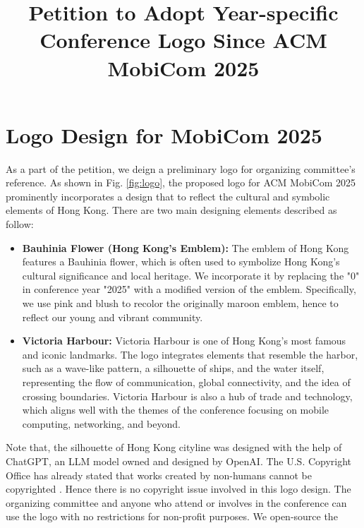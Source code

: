 \documentclass[sigconf, 10pt]{acmart}
\begin{document}
\title{Petition to Adopt Year-specific Conference Logo Since ACM MobiCom 2025}

\newcommand{\wrt}{{\em w.r.t. }}
\newcommand{\para}[1]{\smallskip\noindent {\bf #1}}

\setlength{\abovecaptionskip}{0pt}
\setlength{\belowcaptionskip}{0pt}
\setlength{\abovedisplayshortskip}{0pt}
\setlength{\belowdisplayshortskip}{0pt}
\setlength{\textfloatsep}{0pt}

\begin{abstract}

\end{abstract}




\maketitle

\section{Logo Design for MobiCom 2025}
As a part of the petition, we deign a preliminary logo for organizing committee's  reference. As shown in Fig. \ref{fig:logo}, the proposed logo for ACM MobiCom 2025 prominently incorporates a design that to reflect the cultural and symbolic elements of Hong Kong. There are two main designing elements described as follow:
\begin{itemize}[leftmargin=*]
	\item \textbf{Bauhinia Flower (Hong Kong’s Emblem):} The emblem of Hong Kong features a Bauhinia flower, which is often used to symbolize Hong Kong’s cultural significance and local heritage. We incorporate it by replacing the "0" in conference year "2025" with a modified version of the emblem. Specifically, we use pink and blush to recolor the originally maroon emblem, hence to reflect our young and vibrant community.
	
	\item \textbf{Victoria Harbour:} Victoria Harbour is one of Hong Kong’s most famous and iconic landmarks. The logo integrates elements that resemble the harbor, such as a wave-like pattern, a silhouette of ships, and the water itself, representing the flow of communication, global connectivity, and the idea of crossing boundaries. Victoria Harbour is also a hub of trade and technology, which aligns well with the themes of the conference focusing on mobile computing, networking, and beyond.
\end{itemize}
Note that, the silhouette of Hong Kong cityline  was designed with the help of ChatGPT, an LLM model owned and designed by OpenAI. The U.S. Copyright Office has already stated that works created by non-humans cannot be copyrighted \cite{copyright}. Hence there is no copyright issue involved in this logo design. The organizing committee and anyone who attend or involves in the conference can use the logo with no restrictions for non-profit purposes. We open-source the 
\end{document}

